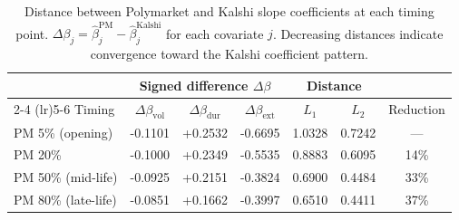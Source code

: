 \begin{table}[H]
\centering
\small
\caption{Distance between Polymarket and Kalshi slope coefficients at each timing point. $\Delta\beta_j = \hat{\beta}^{\text{PM}}_j - \hat{\beta}^{\text{Kalshi}}_j$ for each covariate $j$. Decreasing distances indicate convergence toward the Kalshi coefficient pattern.}
\label{tab:polymarket_vs_kalshi_distance}
\begin{tabular}{lcccccc}
\toprule
 & \multicolumn{3}{c}{Signed difference $\Delta\beta$} & \multicolumn{2}{c}{Distance} & \\
\cmidrule(lr){2-4} \cmidrule(lr){5-6}
Timing & $\Delta\beta_{\text{vol}}$ & $\Delta\beta_{\text{dur}}$ & $\Delta\beta_{\text{ext}}$ & $L_1$ & $L_2$ & Reduction \\
\midrule
PM 5\% (opening) & -0.1101 & +0.2532 & -0.6695 & 1.0328 & 0.7242 & --- \\
PM 20\% & -0.1000 & +0.2349 & -0.5535 & 0.8883 & 0.6095 & 14\% \\
PM 50\% (mid-life) & -0.0925 & +0.2151 & -0.3824 & 0.6900 & 0.4484 & 33\% \\
PM 80\% (late-life) & -0.0851 & +0.1662 & -0.3997 & 0.6510 & 0.4411 & 37\% \\
\bottomrule
\end{tabular}
\end{table}